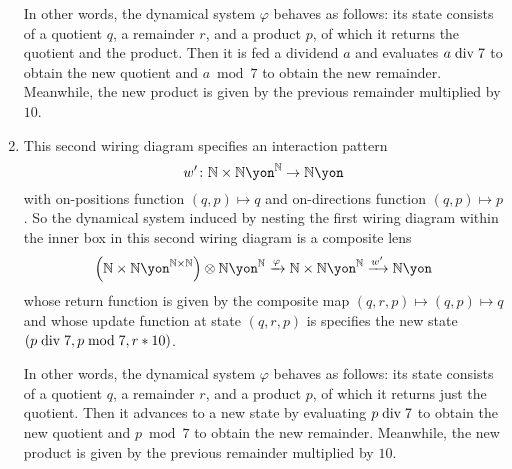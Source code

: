 \documentclass[Book-Poly]{subfiles}
\begin{document}
\begin{exercise}
\begin{solution}
\begin{enumerate}
    In other words, the dynamical system $\varphi$ behaves as follows: its state consists of a quotient $q$, a remainder $r$, and a product $p$, of which it returns the quotient and the product.
    Then it is fed a dividend $a$ and evaluates $a\bdiv7$ to obtain the new quotient and $a\bmod7$ to obtain the new remainder.
    Meanwhile, the new product is given by the previous remainder multiplied by $10$.
    
    \item This second wiring diagram specifies an interaction pattern
    \[
        w'\colon\nn\times\nn\yon^\nn\to\nn\yon
    \]
    with on-positions function $(q,p)\mapsto q$ and on-directions function $(q,p)\mapsto p$.
    So the dynamical system induced by nesting the first wiring diagram within the inner box in this second wiring diagram is a composite lens
    \[
        \left(\nn\times\nn\yon^{\nn\times\nn}\right)\otimes\nn\yon^\nn\To{\varphi}\nn\times\nn\yon^\nn\To{w'}\nn\yon
    \]
    whose return function is given by the composite map $(q,r,p)\mapsto(q,p)\mapsto q$ and whose update function at state $(q,r,p)$ is specifies the new state $(p\bdiv7,p\bmod7,r*10)$.
    
    In other words, the dynamical system $\varphi$ behaves as follows: its state consists of a quotient $q$, a remainder $r$, and a product $p$, of which it returns just the quotient.
    Then it advances to a new state by evaluating $p\bdiv7$ to obtain the new quotient and $p\bmod7$ to obtain the new remainder.
    Meanwhile, the new product is given by the previous remainder multiplied by $10$.
    

\end{enumerate}
\end{solution}
\end{exercise}
\end{document}
